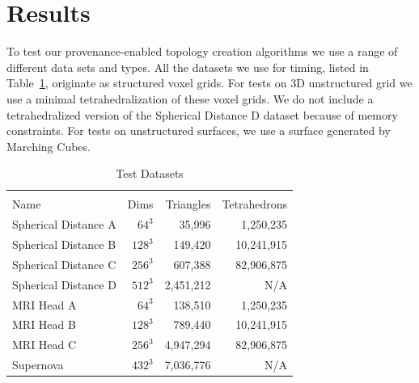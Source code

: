 \documentclass[10pt,journal,cspaper,compsoc]{IEEEtran}
\begin{document}



\section{Results}

To test our provenance-enabled topology creation algorithms we use a range
of different data sets and types.  All the datasets we use for timing,
listed in Table~\ref{tab:datasets}, originate as structured voxel grids.
For tests on 3D unstructured grid we use a minimal tetrahedralization of
these voxel grids.  We do not include a tetrahedralized version of the
Spherical Distance D dataset because of memory constraints.  For tests on
unstructured surfaces, we use a surface generated by Marching Cubes.

\begin{table}[htb]
\begin{center}
\caption{Test Datasets}
\label{tab:datasets}
\begin{tabular}{l r r r}
\multicolumn{4}{c}{ } \\
Name & Dims &  Triangles & Tetrahedrons \\
\hline
Spherical Distance A & $64^3 $ & 35,996    & 1,250,235  \\
Spherical Distance B & $128^3$ & 149,420   & 10,241,915 \\
Spherical Distance C & $256^3$ & 607,388   & 82,906,875 \\
Spherical Distance D & $512^3$ & 2,451,212 & N/A        \\
MRI Head A           & $64^3 $ & 138,510   & 1,250,235  \\
MRI Head B           & $128^3$ & 789,440   & 10,241,915 \\
MRI Head C           & $256^3$ & 4,947,294 & 82,906,875 \\
Supernova			 & $432^3$ & 7,036,776 & N/A        \\
\end{tabular}
\end{center}
\end{table}
\end{document}
